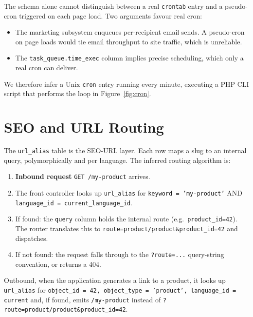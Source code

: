 \documentclass[11pt,a4paper]{article}
\begin{document}
The schema alone cannot distinguish between a real
\texttt{crontab} entry and a pseudo-cron triggered on each page
load. Two arguments favour real cron:

\begin{itemize}[leftmargin=1.6em,itemsep=2pt]
  \item The marketing subsystem enqueues per-recipient email
        sends. A pseudo-cron on page loads would tie email
        throughput to site traffic, which is unreliable.
  \item The \texttt{task\_queue.time\_exec} column implies
        precise scheduling, which only a real cron can deliver.
\end{itemize}

We therefore infer a Unix \texttt{cron} entry running every
minute, executing a PHP CLI script that performs the loop in
Figure~\ref{fig:cron}.

\section{SEO and URL Routing}\label{sec:seo}

The \texttt{url\_alias} table is the SEO-URL layer. Each row
maps a slug to an internal query, polymorphically and per
language. The inferred routing algorithm is:

\begin{enumerate}[leftmargin=1.6em,itemsep=2pt]
  \item \textbf{Inbound request} \texttt{GET /my-product} arrives.
  \item The front controller looks up \texttt{url\_alias} for
        \texttt{keyword = 'my-product'} AND
        \texttt{language\_id = current\_language\_id}.
  \item If found: the \texttt{query} column holds the internal
        route (e.g.\ \texttt{product\_id=42}). The router
        translates this to
        \texttt{route=product/product\&product\_id=42} and
        dispatches.
  \item If not found: the request falls through to the
        \texttt{?route=...} query-string convention, or returns
        a 404.
\end{enumerate}

Outbound, when the application generates a link to a product,
it looks up \texttt{url\_alias} for
\texttt{object\_id = 42, object\_type = 'product', language\_id = current}
and, if found, emits \texttt{/my-product} instead of
\texttt{?route=product/product\&product\_id=42}.
\end{document}
